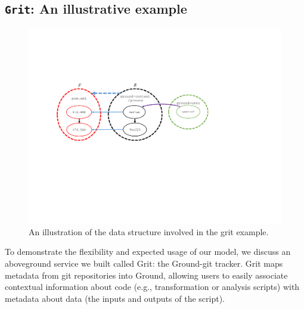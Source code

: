 \documentclass{sig-alternate}
\begin{document}


\subsection{\texttt{Grit}: An illustrative example}
\begin{figure}[th]
\centering
\includegraphics[width=0.75\linewidth]{grit.pdf}
\caption{An illustration of the data structure involved in the grit example.}
\label{fig:grit}
\end{figure}

To demonstrate the flexibility and expected usage of our model, we discuss an aboveground service we built called Grit: the Ground-git tracker. Grit maps metadata from git repositories into Ground, allowing users to easily associate contextual information about code (e.g., transformation or analysis scripts) with metadata about data (the inputs and outputs of the script).
\end{document}
